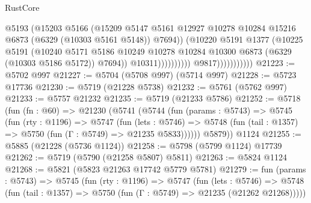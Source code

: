 \begin{lexlean}{RustCore}
\begin{coremodule}
                                            @5193
                                            (@15203
                                              @5166
                                              (@15209
                                                @5147
                                                @5161
                                                @12927
                                                @10278
                                                @10284
                                                @15216
                                                @6873
                                                (@6329 (@10303 @5161 @5148))
                                                @7694))
                                            (@10220
                                              @5191
                                              @1377
                                              (@10225
                                                @5191
                                                (@10240
                                                  @5171
                                                  @5186
                                                  @10249
                                                  @10278
                                                  @10284
                                                  @10300
                                                  @6873
                                                  (@6329 (@10303 @5186 @5172))
                                                  @7694))
                                              @10311))))))))))
                          @9817)))))))))))
@21223 := @5702 @997
@21227 := @5704 (@5708 @997) (@5714 @997)
@21228 := @5723 @17736
@21230 := @5719 (@21228 @5738)
@21232 := @5761 (@5762 @997)
@21233 := @5757 @21232
@21235 := @5719 (@21233 @5786)
@21252 := @5718
    (fun (fn : @60) =>
    @21230
      (@5741
        (@5744
          (fun (params : @5743) =>
          @5745
            (fun (rty : @1196) =>
            @5747
              (fun (lets : @5746) =>
              @5748 (fun (tail : @1357) => @5750 (fun (Γ : @5749) => @21235 @5833))))))
        @5879))
    @1124
@21255 := @5885 (@21228 (@5736 @1124))
@21258 := @5798 (@5799 @1124) @17739
@21262 := @5719 (@5790 (@21258 @5807) @5811)
@21263 := @5824 @1124
@21268 := @5821 (@5823 @21263 @17742 @5779 @5781)
@21279 := fun (params : @5743) =>
  @5745
    (fun (rty : @1196) =>
    @5747
      (fun (lets : @5746) =>
      @5748 (fun (tail : @1357) => @5750 (fun (Γ : @5749) => @21235 (@21262 @21268)))))

\end{coremodule}
\end{lexlean}
